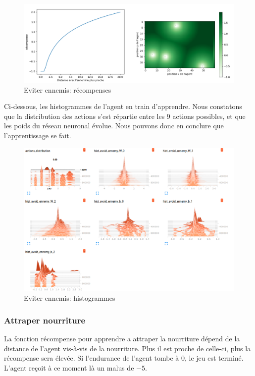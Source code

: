 \documentclass[11pt,a4paper]{report}
\begin{document}
   \begin{figure}[!h]
   \center
   \includegraphics[scale=0.4]{ressources/reward_function_avoid_ennemies.png}
   \caption{Eviter ennemis: récompenses}
   \end{figure} 
   
  \newpage
  \par Ci-dessous, les histogrammes de l'agent en train d'apprendre. Nous constatons que la distribution des actions s'est répartie entre les 9 actions possibles, et que les poids du réseau neuronal évolue. Nous pouvons donc en conclure que l'apprentissage se fait. 
  
   \begin{figure}[!h]
   \center
   \includegraphics[scale=0.4]{ressources/reward_function_histograms_avoid_ennemies.png}
   \caption{Eviter ennemis: histogrammes}
   \end{figure} 
 
 \newpage
 \subsubsection{Attraper nourriture}
 
   \par La fonction récompense pour apprendre a attraper la nourriture dépend de la distance de l'agent vis-à-vis de la nourriture. Plus il est proche de celle-ci, plus la récompense sera élevée. Si l'endurance de l'agent tombe à 0, le jeu est terminé. L'agent reçoit à ce moment là un malus de $-5$. 
   
\end{document}
